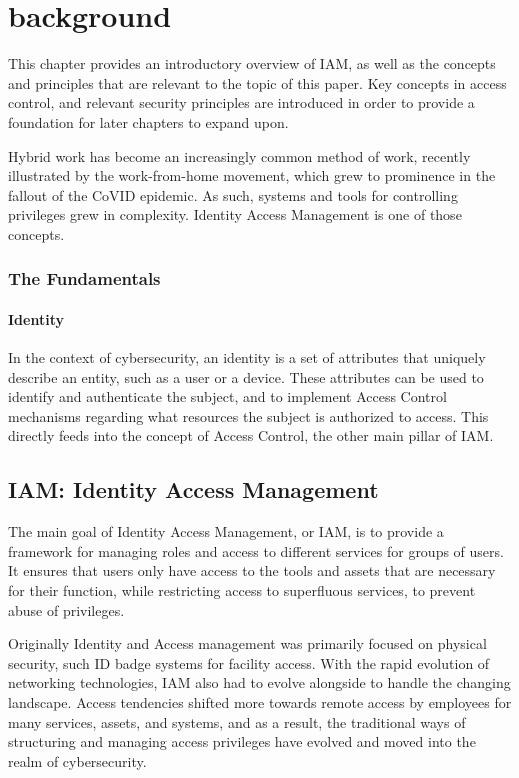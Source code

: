 \section{background}
This chapter provides an introductory overview of IAM, as well as the concepts and principles that are relevant to the topic of this paper. Key concepts in access control, and relevant security principles are introduced in order to provide a foundation for later chapters to expand upon.


Hybrid work has become an increasingly common method of work, recently illustrated by the work-from-home movement, which grew to prominence in the fallout of the CoVID epidemic. As such, systems and tools for controlling privileges grew in complexity. Identity Access Management is one of those concepts.

\subsubsection{The Fundamentals}
\paragraph{Identity}
In the context of cybersecurity, an identity is a set of attributes that uniquely describe an entity, such as a user or a device. These attributes can be used to identify and authenticate the subject, and to implement Access Control mechanisms regarding what resources the subject is authorized to access\citep{Gartner-DefIAM}. This directly feeds into the concept of Access Control, the other main pillar of IAM.

\subsection{IAM: Identity Access Management}
The main goal of Identity Access Management, or IAM, is to provide a framework for managing roles and access to different services for groups of users\citep{Gartner-DefIAM}. It ensures that users only have access to the tools and assets that are necessary for their function, while restricting access to superfluous services, to prevent abuse of privileges.

Originally Identity and Access management was primarily focused on physical security, such ID badge systems for facility access. With the rapid evolution of networking technologies, IAM also had to evolve alongside to handle the changing landscape. Access tendencies shifted more towards remote access by employees for many services, assets, and systems, and as a result, the traditional ways of structuring and managing access privileges have evolved and moved into the realm of cybersecurity\citep{StrongDM-IAM}.

